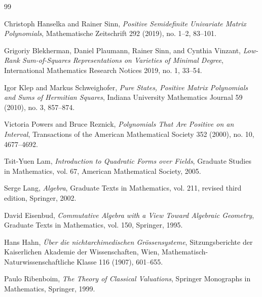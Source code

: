 \documentclass[uplatex,dvipdfmx]{jsarticle}
\theoremstyle{matrixsosdefinition}
\begin{document}
\begin{thebibliography}{99}

Christoph Hanselka and Rainer Sinn,
\emph{Positive Semidefinite Univariate Matrix Polynomials},
Mathematische Zeitschrift 292 (2019), no. 1--2, 83--101.

Grigoriy Blekherman, Daniel Plaumann, Rainer Sinn, and Cynthia Vinzant,
\emph{Low-Rank Sum-of-Squares Representations on Varieties of Minimal Degree},
International Mathematics Research Notices 2019, no. 1, 33--54.

Igor Klep and Markus Schweighofer,
\emph{Pure States, Positive Matrix Polynomials and Sums of Hermitian Squares},
Indiana University Mathematics Journal 59 (2010), no. 3, 857--874.

Victoria Powers and Bruce Reznick,
\emph{Polynomials That Are Positive on an Interval},
Transactions of the American Mathematical Society 352 (2000), no. 10,
4677--4692.

Tsit-Yuen Lam,
\emph{Introduction to Quadratic Forms over Fields},
Graduate Studies in Mathematics, vol. 67, American Mathematical Society, 2005.

Serge Lang,
\emph{Algebra},
Graduate Texts in Mathematics, vol. 211, revised third edition, Springer, 2002.

David Eisenbud,
\emph{Commutative Algebra with a View Toward Algebraic Geometry},
Graduate Texts in Mathematics, vol. 150, Springer, 1995.

Hans Hahn,
\emph{\"Uber die nichtarchimedischen Gr\"ossensysteme},
Sitzungsberichte der Kaiserlichen Akademie der Wissenschaften, Wien,
Mathematisch-Naturwissenschaftliche Klasse 116 (1907), 601--655.

Paulo Ribenboim,
\emph{The Theory of Classical Valuations},
Springer Monographs in Mathematics, Springer, 1999.

\end{thebibliography}
\end{document}
